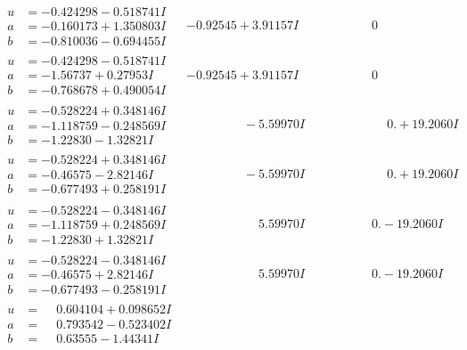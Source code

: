 \documentclass[1p]{elsarticle_modified}
\theoremstyle{definition}
\begin{document}
$$\begin{array}{c|c|c}
\begin{aligned}
u &= -0.424298 - 0.518741 I \\
a &= -0.160173 + 1.350803 I \\
b &= -0.810036 - 0.694455 I\end{aligned}
 & -0.92545 + 3.91157 I & \phantom{-0.000000 } 0 \\ \hline\begin{aligned}
u &= -0.424298 - 0.518741 I \\
a &= -1.56737 + 0.27953 I \\
b &= -0.768678 + 0.490054 I\end{aligned}
 & -0.92545 + 3.91157 I & \phantom{-0.000000 } 0 \\ \hline\begin{aligned}
u &= -0.528224 + 0.348146 I \\
a &= -1.118759 - 0.248569 I \\
b &= -1.22830 - 1.32821 I\end{aligned}
 & \phantom{-0.000000 } -5.59970 I & \phantom{-0.000000 -}0. + 19.2060 I \\ \hline\begin{aligned}
u &= -0.528224 + 0.348146 I \\
a &= -0.46575 - 2.82146 I \\
b &= -0.677493 + 0.258191 I\end{aligned}
 & \phantom{-0.000000 } -5.59970 I & \phantom{-0.000000 -}0. + 19.2060 I \\ \hline\begin{aligned}
u &= -0.528224 - 0.348146 I \\
a &= -1.118759 + 0.248569 I \\
b &= -1.22830 + 1.32821 I\end{aligned}
 & \phantom{-0.000000 -}5.59970 I & \phantom{-0.000000 } 0. - 19.2060 I \\ \hline\begin{aligned}
u &= -0.528224 - 0.348146 I \\
a &= -0.46575 + 2.82146 I \\
b &= -0.677493 - 0.258191 I\end{aligned}
 & \phantom{-0.000000 -}5.59970 I & \phantom{-0.000000 } 0. - 19.2060 I \\ \hline\begin{aligned}
u &= \phantom{-}0.604104 + 0.098652 I \\
a &= \phantom{-}0.793542 - 0.523402 I \\
b &= \phantom{-}0.63555 - 1.44341 I\end{aligned}

\end{array}$$
\end{document}
